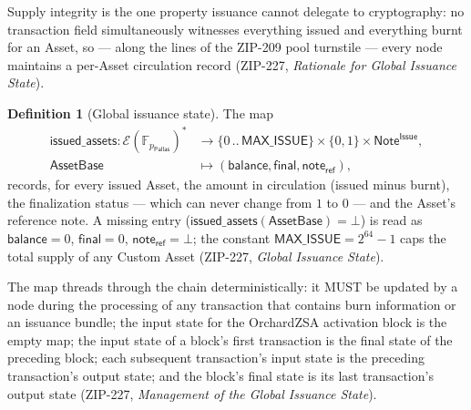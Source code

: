 \documentclass[11pt,a4paper]{article}
\theoremstyle{definition}
\newtheorem{definition}[theorem]{Definition}
\newcommand{\F}{\mathbb{F}}
\newcommand{\Pallas}{\ensuremath{\mathsf{Pallas}}}
\newcommand{\Ep}{\ensuremath{\mathcal{E}}}
\begin{document}
Supply integrity is the one property issuance cannot delegate to
cryptography: no transaction field simultaneously witnesses everything
issued and everything burnt for an Asset, so --- along the lines of the
ZIP-209 pool turnstile --- every node maintains a per-Asset circulation
record (ZIP-227, \emph{Rationale for Global Issuance State}).

\begin{definition}[Global issuance state]\label{def:zsa-issued-assets}
The map
\[
\begin{aligned}
\mathsf{issued\_assets} : \Ep(\F_{p_{\Pallas}})^{\ast} &\to
  \{0\,..\,\mathsf{MAX\_ISSUE}\} \times \{0,1\} \times
  \mathsf{Note}^{\mathsf{Issue}},\\
\mathsf{AssetBase} &\mapsto (\mathsf{balance}, \mathsf{final},
  \mathsf{note_{ref}}),
\end{aligned}
\]
records, for every issued Asset, the amount in circulation (issued minus
burnt), the finalization status --- which can never change from $1$ to
$0$ --- and the Asset's reference note. A missing entry
($\mathsf{issued\_assets}(\mathsf{AssetBase}) = \bot$) is read as
$\mathsf{balance} = 0$, $\mathsf{final} = 0$,
$\mathsf{note_{ref}} = \bot$; the constant $\mathsf{MAX\_ISSUE} =
2^{64} - 1$ caps the total supply of any Custom Asset (ZIP-227,
\emph{Global Issuance State}).
\end{definition}

The map threads through the chain deterministically: it MUST be updated
by a node during the processing of any transaction that contains burn
information or an issuance bundle; the input state for the OrchardZSA
activation block is the empty map; the input state of a block's first
transaction is the final state of the preceding block; each subsequent
transaction's input state is the preceding transaction's output state;
and the block's final state is its last transaction's output state
(ZIP-227, \emph{Management of the Global Issuance State}).
\end{document}
